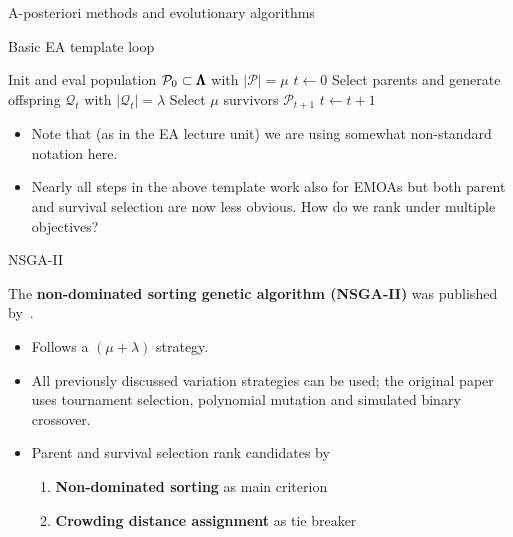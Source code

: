 \begin{frame}[allowframebreaks]{A-posteriori methods and evolutionary algorithms}
\framebreak

\begin{algorithm}[H]
  \begin{center}
  \caption{Basic EA template loop}
      \begin{algorithmic}[1]
          \STATE Init and eval population $\mathcal{P}_0 \subset \pmb{\Lambda}$ with $|\mathcal{P}| = \mu$ 
      \STATE $t \leftarrow 0$
      \REPEAT
        \STATE Select parents and generate offspring $\mathcal{Q}_t$ with $|\mathcal{Q}_t| = \lambda$
        \STATE Select $\mu$ survivors $\mathcal{P}_{t + 1}$ 
 		\STATE $t \leftarrow t + 1$
     \end{algorithmic}
    \end{center}
\end{algorithm}


\begin{itemize}
    \item Note that (as in the EA lecture unit) we are using somewhat non-standard notation here.
    \item Nearly all steps in the above template work also for EMOAs but both parent and survival 
      selection are now less obvious. How do we rank under multiple objectives?
\end{itemize}
\end{frame}


\begin{frame}{NSGA-II}

The \textbf{non-dominated sorting genetic algorithm (NSGA-II)} was published by~.

\begin{itemize}
\item Follows a $(\mu + \lambda)$ strategy.
\item All previously discussed variation strategies can be used; 
    the original paper uses tournament selection, polynomial mutation and simulated binary crossover.
\item Parent and survival selection rank candidates by 
\begin{enumerate}
\item \textbf{Non-dominated sorting} as main criterion
\item \textbf{Crowding distance assignment} as tie breaker
\end{enumerate}
\end{itemize}

\end{frame}


